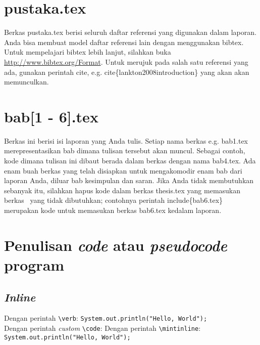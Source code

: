 \section{pustaka.tex}
Berkas pustaka.tex berisi seluruh daftar referensi yang digunakan dalam 
laporan. 
Anda bisa membuat model daftar referensi lain dengan menggunakan bibtex.
Untuk mempelajari bibtex lebih lanjut, silahkan buka 
\url{http://www.bibtex.org/Format}. 
Untuk merujuk pada salah satu referensi yang ada, gunakan perintah \bslash 
cite, e.g. \bslash cite\{lankton2008introduction\} yang akan akan memunculkan.


\section{bab[1 - 6].tex}
Berkas ini berisi isi laporan yang Anda tulis. 
Setiap nama berkas e.g. bab1.tex merepresentasikan bab dimana tulisan tersebut 
akan muncul. 
Sebagai contoh, kode dimana tulisan ini dibaut berada dalam berkas dengan nama 
bab4.tex. 
Ada enam buah berkas yang telah disiapkan untuk mengakomodir enam bab dari 
laporan Anda, diluar bab kesimpulan dan saran. 
Jika Anda tidak membutuhkan sebanyak itu, silahkan hapus kode dalam berkas 
thesis.tex yang memasukan berkas \latex~yang tidak dibutuhkan;  contohnya 
perintah \bslash include\{bab6.tex\} merupakan kode untuk memasukan berkas 
bab6.tex kedalam laporan.

\section{Penulisan \textit{code} atau \textit{pseudocode} program}

\subsection{\textit{Inline}}

Dengan perintah \verb|\verb|: \verb|System.out.println("Hello, World");| \\
Dengan perintah \textit{custom} \verb|\code|: 
Dengan perintah \verb|\mintinline|: \texttt{System.out.println("Hello, World"); }

